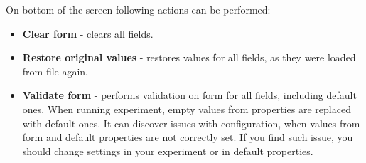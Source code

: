 On bottom of the screen following actions can be performed:
\begin{itemize}
	\item \textbf{Clear form} - clears all fields.
	\item \textbf{Restore original values} - restores values for all fields, as they were loaded from file again.
	\item \textbf{Validate form} - performs validation on form for all fields, including default ones. When running experiment, empty values from properties are replaced with default ones. It can discover issues with configuration, when values from form and default properties are not correctly set. If you find such issue, you should change settings in your experiment or in default properties.
\end{itemize}

